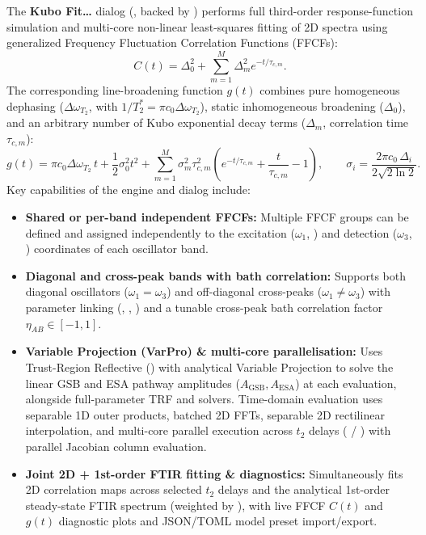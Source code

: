 The \textbf{Kubo Fit\ldots} dialog (, backed by ) performs full third-order response-function simulation and multi-core non-linear least-squares fitting of 2D spectra using generalized Frequency Fluctuation Correlation Functions (FFCFs):
\begin{equation}
  C(t) = \Delta_0^2 + \sum_{m=1}^{M} \Delta_m^2 e^{-t/\tau_{c,m}}.
\end{equation}
The corresponding line-broadening function $g(t)$ combines pure homogeneous dephasing ($\Delta\omega_{T_2}$, with $1/T_2^* = \pi c_0 \Delta\omega_{T_2}$), static inhomogeneous broadening ($\Delta_0$), and an arbitrary number of Kubo exponential decay terms ($\Delta_m$, correlation time $\tau_{c,m}$):
\begin{equation}
  g(t) = \pi c_0 \Delta\omega_{T_2}\, t + \frac{1}{2}\sigma_0^2 t^2 + \sum_{m=1}^{M} \sigma_m^2 \tau_{c,m}^2 \left( e^{-t/\tau_{c,m}} + \frac{t}{\tau_{c,m}} - 1 \right),
  \qquad \sigma_i = \frac{2\pi c_0 \, \Delta_i}{2\sqrt{2\ln 2}}.
\end{equation}
Key capabilities of the engine and dialog include:
\begin{itemize}
  \item \textbf{Shared or per-band independent FFCFs:} Multiple FFCF groups can be defined and assigned independently to the excitation ($\omega_1$, ) and detection ($\omega_3$, ) coordinates of each oscillator band.
  \item \textbf{Diagonal and cross-peak bands with bath correlation:} Supports both diagonal oscillators ($\omega_1 = \omega_3$) and off-diagonal cross-peaks ($\omega_1 \ne \omega_3$) with parameter linking (, , ) and a tunable cross-peak bath correlation factor $\eta_{AB} \in [-1, 1]$.
  \item \textbf{Variable Projection (VarPro) \& multi-core parallelisation:} Uses Trust-Region Reflective () with analytical Variable Projection to solve the linear GSB and ESA pathway amplitudes ($A_{\text{GSB}}, A_{\text{ESA}}$) at each evaluation, alongside full-parameter TRF and  solvers. Time-domain evaluation uses separable 1D outer products, batched 2D FFTs, separable 2D rectilinear interpolation, and multi-core parallel execution across $t_2$ delays ( / ) with parallel Jacobian column evaluation.
  \item \textbf{Joint 2D + 1st-order FTIR fitting \& diagnostics:} Simultaneously fits 2D correlation maps across selected $t_2$ delays and the analytical 1st-order steady-state FTIR spectrum (weighted by ), with live FFCF $C(t)$ and $g(t)$ diagnostic plots and JSON/TOML model preset import/export.
\end{itemize}

